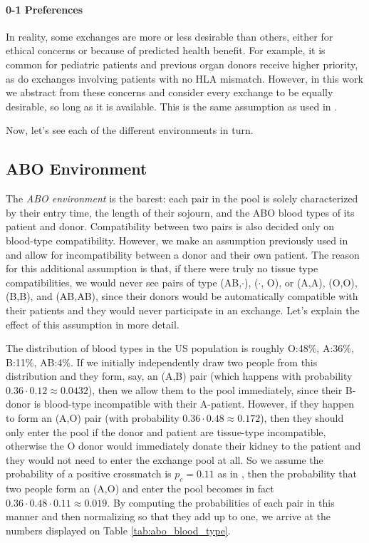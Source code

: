 \documentclass[12pt]{article}
\begin{document}
\paragraph{0-1 Preferences} In reality, some exchanges are more or less desirable than others, either for ethical concerns or because of predicted health benefit. For example, it is common for pediatric patients and previous organ donors receive higher priority, as do exchanges involving patients with no HLA mismatch. However, in this work we abstract from these concerns and consider every exchange to be equally desirable, so long as it is available. This is the same assumption as used in \cite{roth2005pairwise}.


\noindent Now, let's see each of the different environments in turn.  

\subsection{ABO Environment}

The \emph{ABO environment} is the barest: each pair in the pool is solely characterized by their entry time, the length of their sojourn, and the ABO blood types of its patient and donor. Compatibility between two pairs is also decided only on blood-type compatibility. However, we make an assumption previously used in \cite{unver2010dynamic} and allow for incompatibility between a donor and their own patient. The reason for this additional assumption is that, if there were truly no tissue type compatibilities, we would never see pairs of type (AB,$\cdot$), ($\cdot$, O), or (A,A), (O,O), (B,B), and (AB,AB), since their donors would be automatically compatible with their patients and they would never participate in an exchange. Let's explain the effect of this assumption in more detail.

The distribution of blood types in the US population is roughly O:48\%, A:36\%, B:11\%, AB:4\%. If we initially independently draw two people from this distribution and they form, say, an (A,B) pair (which happens with probability $0.36 \cdot 0.12 \approx 0.0432$), then we allow them to the pool immediately, since their B-donor is blood-type incompatible with their A-patient. However, if they happen to form an (A,O) pair (with probability $0.36 \cdot 0.48 \approx 0.172$), then they should only enter the pool if the donor and patient are tissue-type incompatible, otherwise the O donor would immediately donate their kidney to the patient and they would not need to enter the exchange pool at all. So we assume the probability of a positive crossmatch is $p_c = 0.11$ as in \cite{zenios2001primum}, then the probability that two people form an (A,O) and enter the pool becomes in fact $0.36 \cdot 0.48  \cdot 0.11 \approx 0.019$. By computing the probabilities of each pair in this manner and then normalizing so that they add up to one, we arrive at the numbers displayed on Table \ref{tab:abo_blood_type}. 
\end{document}
